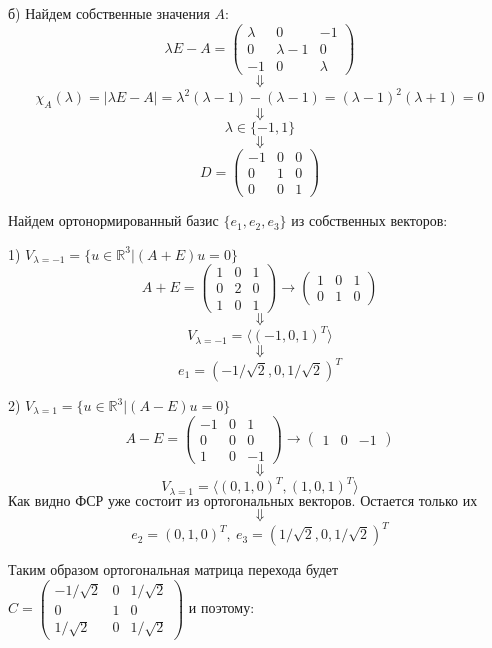 \documentclass{article}
\begin{document}
\par
б) Найдем собственные значения $A$:
$$\lambda E - A = \left(\begin{array}{ccc}\lambda & 0 & -1\\0 & \lambda-1 & 0\\-1 & 0 & \lambda\end{array}\right)$$
$$\Downarrow$$
$$\chi_{A}(\lambda)=|\lambda E - A |=\lambda^2(\lambda-1)-(\lambda-1)=(\lambda-1)^2(\lambda+1)=0$$
$$\Downarrow$$
$$\lambda\in\{-1, 1\}$$
$$\Downarrow$$
$$D=\left(\begin{array}{rrr}-1 & 0 & 0\\0 & 1 & 0\\0 & 0 & 1\end{array}\right)$$
\par
Найдем ортонормированный базис $\{e_1, e_2, e_3\}$ из собственных векторов:
\par
1) $V_{\lambda=-1}=\{u\in\mathbb{R}^3|(A+E)u=0\}$
$$A+E=\left(\begin{array}{rrr}1 & 0 & 1\\0 & 2 & 0\\1 & 0 & 1\end{array}\right)\rightarrow\left(\begin{array}{rrr}1 & 0 & 1\\0 & 1 & 0\end{array}\right)$$
$$\Downarrow$$
$$V_{\lambda=-1}=\langle (-1, 0, 1)^T \rangle$$
$$\Downarrow$$
$$e_1 = (-1/\sqrt{2}, 0, 1/\sqrt{2})^T$$
\par
2) $V_{\lambda=1}=\{u\in\mathbb{R}^3|(A-E)u=0\}$
$$A-E=\left(\begin{array}{rrr}-1 & 0 & 1\\0 & 0 & 0\\1 & 0 & -1\end{array}\right)\rightarrow\left(\begin{array}{rrr}1 & 0 & -1\end{array}\right)$$
$$\Downarrow$$
$$V_{\lambda=1}=\langle (0, 1, 0)^T, (1, 0, 1)^T \rangle$$ 
$$\textrm{Как видно ФСР уже состоит из ортогональных векторов. Остается только их отнормировать.}$$
$$\Downarrow$$
$$e_2 = (0, 1, 0)^T,\ e_3 = (1/\sqrt{2}, 0, 1/\sqrt{2})^T$$
\par
Таким образом ортогональная матрица перехода будет $C=\left(\begin{array}{rrr}-1/\sqrt{2} & 0 & 1/\sqrt{2}\\0 & 1 & 0\\1/\sqrt{2} & 0 & 1/\sqrt{2}\end{array}\right)$ и поэтому:
\end{document}
